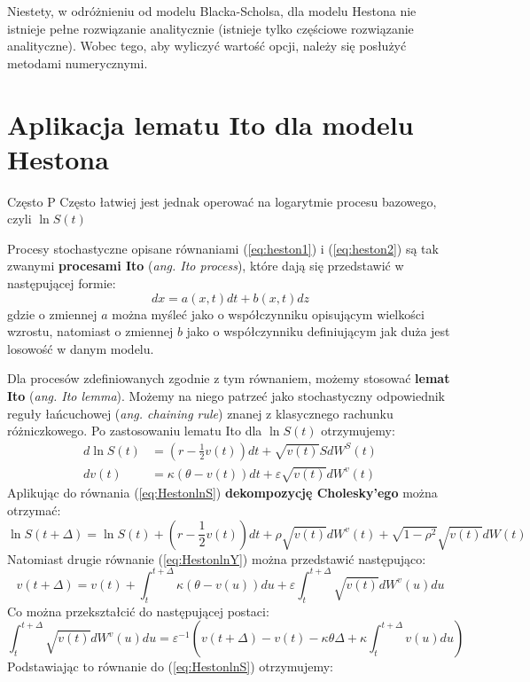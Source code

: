 \documentclass{pracamgr}
\begin{document}
Niestety, w odróżnieniu od modelu Blacka-Scholsa, dla modelu Hestona nie istnieje pełne rozwiązanie 
analitycznie (istnieje tylko częściowe rozwiązanie analityczne). Wobec tego, aby 
wyliczyć wartość opcji, należy się posłużyć metodami numerycznymi.

\section{Aplikacja lematu Ito dla modelu Hestona}

Często P
Często łatwiej jest jednak operować na logarytmie procesu bazowego, czyli $\ln S(t)$

Procesy stochastyczne opisane równaniami (\ref{eq:heston1}) i (\ref{eq:heston2}) są tak zwanymi \textbf{procesami Ito}
(\textit{ang. Ito process}), które dają się przedstawić w 
następującej formie:
\begin{equation}
  dx = a(x,t) dt + b(x,t) dz
\end{equation}
gdzie o zmiennej $a$ można myśleć jako o współczynniku opisującym
wielkości wzrostu, natomiast 
o zmiennej $b$ jako o współczynniku definiującym jak duża jest losowość w danym 
modelu.

Dla procesów zdefiniowanych zgodnie z tym równaniem, możemy 
stosować \textbf{lemat Ito} (\textit{ang. Ito lemma}). Możemy na niego patrzeć jako stochastyczny odpowiednik
reguły łańcuchowej (\textit{ang. chaining rule}) znanej z klasycznego rachunku 
różniczkowego. 
Po zastosowaniu lematu Ito dla $\ln S(t)$ otrzymujemy:
\begin{subequations}
\begin{align}
d \ln S(t) &= \left( r - \frac{1}{2} v(t) \right) dt 
              + \sqrt{v(t)} SdW^S(t) \label{eq:HestonlnS} \\
dv(t)      &= \kappa (\theta - v(t))dt + \varepsilon 
              \sqrt{v(t)} dW^v(t)  \label{eq:HestonlnY}
\end{align} 
\end{subequations}
Aplikując do równania (\ref{eq:HestonlnS}) \textbf{dekompozycję Cholesky'ego} można
otrzymać:
\begin{equation}
  \ln S(t + \Delta) = \ln S(t) + \left( r - \frac{1}{2} v(t) \right) dt 
              + \rho \sqrt{v(t)} dW^v(t) + \sqrt{1 - \rho^2} \sqrt{v(t)} dW(t)
\end{equation}
Natomiast drugie równanie (\ref{eq:HestonlnY}) można przedstawić następująco:
\begin{equation}
  v(t + \Delta)      = v(t) + \int_t^{t+\Delta} \kappa 
                        (\theta - v(u))du + \varepsilon 
                        \int_t^{t+\Delta}  \sqrt{v(t)} dW^v(u) du 
\end{equation}
Co można przekształcić do następującej postaci:
\begin{equation}
  \int_t^{t+\Delta}  \sqrt{v(t)} dW^v(u) du  = \varepsilon^{-1} \left(v(t+\Delta) 
  - v(t) - \kappa \theta \Delta + \kappa \int_t^{t+\Delta}  v(u) du \right)
\end{equation}
Podstawiając to równanie do (\ref{eq:HestonlnS}) otrzymujemy:
\end{document}
